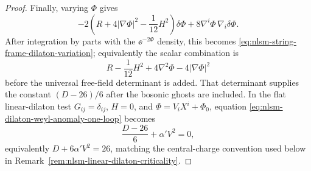 \begin{proof}
Finally, varying \(\Phi\) gives
\[
  -2
  \left(R+4|\nabla\Phi|^2-\frac1{12}H^2\right)\delta\Phi
  +
  8\nabla^i\Phi\,\nabla_i\delta\Phi .
\]
After integration by parts with the \(\ee^{-2\Phi}\) density, this becomes
\eqref{eq:nlsm-string-frame-dilaton-variation}; equivalently the scalar
combination is
\[
  R-\frac1{12}H^2+4\nabla^2\Phi-4|\nabla\Phi|^2
\]
before the universal free-field determinant is added.  That determinant
supplies the constant \((D-26)/6\) after the bosonic ghosts are included.  In
the flat linear-dilaton test \(G_{ij}=\delta_{ij}\), \(H=0\), and
\(\Phi=V_iX^i+\Phi_0\), equation
\eqref{eq:nlsm-dilaton-weyl-anomaly-one-loop} becomes
\[
  \frac{D-26}{6}+\alpha' V^2=0,
\]
equivalently \(D+6\alpha'V^2=26\), matching the central-charge convention
used below in Remark~\ref{rem:nlsm-linear-dilaton-criticality}.
\end{proof}

